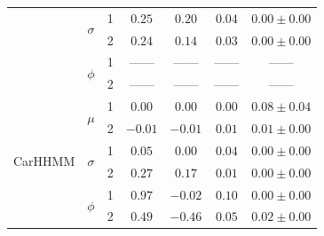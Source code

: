 \documentclass[12pt]{TD-CJS}
\begin{document}
{\begin{tabular}{ccccccc}
                           & \multirow{2}{*}{$\sigma$}     & 1                             & $0.25$                         & $0.20$                     & $0.04$                             & $0.00 \pm 0.00$                             \\
                           &                               & 2                             & $0.24$                         & $0.14$                     & $0.03$                             & $0.00 \pm 0.00$                             \\ 
                           & \multirow{2}{*}{$\phi$}       & 1                             & ------                         & ------                     & ------                             & ------                                      \\
                           &                               & 2                             & ------                         & ------                     & ------                             & ------                                      \\ \hline
\multirow{6}{*}{CarHHMM}   & \multirow{2}{*}{$\mu$}        & 1                             & $0.00$                         & $0.00$                     & $0.00$                             & $0.08 \pm 0.04$                             \\
                           &                               & 2                             & $-0.01$                         & $-0.01$                     & $0.01$                             & $0.01 \pm 0.00$                             \\
                           & \multirow{2}{*}{$\sigma$}     & 1                             & $0.05$                         & $0.00$                     & $0.04$                             & $0.00 \pm 0.00$                             \\
                           &                               & 2                             & $0.27$                         & $0.17$                     & $0.01$                             & $0.00 \pm 0.00$                             \\ 
                           & \multirow{2}{*}{$\phi$}       & 1                             & $0.97$                         & $-0.02$                     & $0.10$                             & $0.00 \pm 0.00$                             \\
                           &                               & 2                             & $0.49$                         & $-0.46$                     & $0.05$                             & $0.02 \pm 0.00$                             \\ \hline

\end{tabular}}
\end{document}
